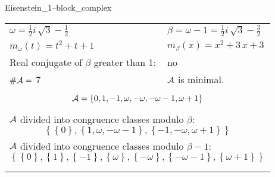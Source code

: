 \begin{exmp}
\label{ex:compareAA}

Eisenstein\_1--block\_complex

\rule{0cm}{0cm}

\begin{tabular}{ll}
$\omega=  \frac{1}{2} i \, \sqrt{3} - \frac{1}{2} $  & $\beta= \omega - 1 = \frac{1}{2} i \, \sqrt{3} - \frac{3}{2} $\\
$m_\omega(t)=  t^{2} + t + 1 $  & $m_\beta(x)=  x^{2} + 3 \, x + 3 $\\
Real conjugate of $\beta$ greater than 1:   &  no \\
$\#\mathcal{A}= $ 7 $ $ & $\mathcal{A}$ is minimal. \\
\multicolumn{2}{l}{\begin{minipage}{\textwidth}\begin{dmath*}\A = \left\{0, 1, -1, \omega, -\omega, -\omega - 1, \omega + 1\right\}  \end{dmath*}\end{minipage} }\\
\multicolumn{2}{l}{\begin{minipage}{\textwidth}$\mathcal{A}$ divided into congruence classes modulo $\beta$: \begin{dmath*} \left\{\left\{0\right\}, \left\{1, \omega, -\omega - 1\right\}, \left\{-1, -\omega, \omega + 1\right\}\right\}  \end{dmath*}\end{minipage} }\\[10pt]
\multicolumn{2}{l}{\begin{minipage}{\textwidth}$\mathcal{A}$ divided into congruence classes modulo $\beta-1$: \begin{dmath*} \left\{\left\{0\right\}, \left\{1\right\}, \left\{-1\right\}, \left\{\omega\right\}, \left\{-\omega\right\}, \left\{-\omega - 1\right\}, \left\{\omega + 1\right\}\right\}  \end{dmath*}\end{minipage} }\\
 & \\ \hline
 & \\
\end{tabular}


\end{exmp}
